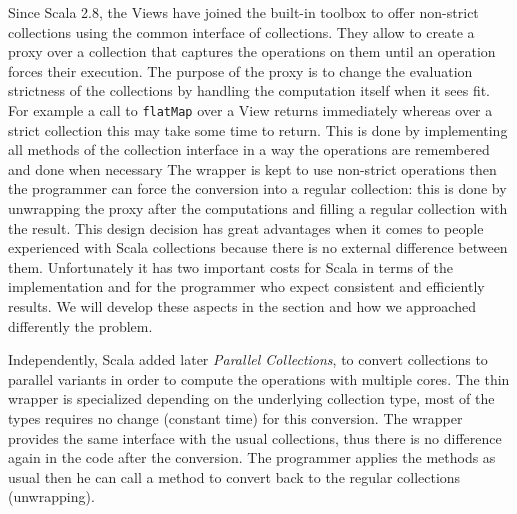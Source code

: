 \documentclass[a4paper,12pt,twocolumn]{article}
\begin{document}
Since Scala 2.8, the Views have joined the built-in toolbox to offer non-strict collections using the common interface of collections.
They allow to create a proxy over a collection that captures the operations on them until an operation forces their execution.
The purpose of the proxy is to change the evaluation strictness of the collections by handling the computation itself when it sees fit.
For example a call to \verb|flatMap| over a View returns immediately whereas over a strict collection this may take some time to return.
This is done by implementing all methods of the collection interface in a way the operations are remembered and done when necessary
The wrapper is kept to use non-strict operations then the programmer can force the conversion into a regular collection: this is done by unwrapping the proxy after the computations and filling a regular collection with the result.
This design decision has great advantages when it comes to people experienced with Scala collections because there is no external difference between them.
Unfortunately it has two important costs for Scala in terms of the implementation and for the programmer who expect consistent and efficiently results.
We will develop these aspects in the section and how we approached differently the problem.

Independently, Scala added later {\it Parallel Collections}, to convert collections to parallel variants in order to compute the operations with multiple cores.
The thin wrapper is specialized depending on the underlying collection type, most of the types requires no change (constant time) for this conversion.
The wrapper provides the same interface with the usual collections, thus there is no difference again in the code after the conversion.
The programmer applies the methods as usual then he can call a method to convert back to the regular collections (unwrapping).
\end{document}
